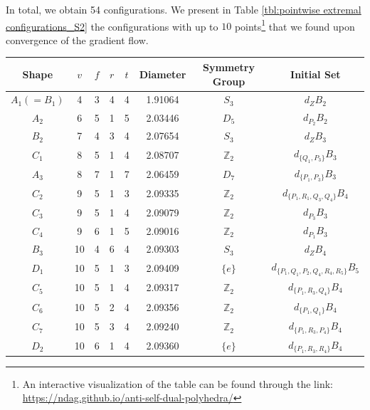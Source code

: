 \documentclass[12pt]{amsart}
\theoremstyle{plain}
\numberwithin{equation}{section}
\begin{document}
In total, we obtain 54 configurations.
We present in Table \ref{tbl:pointwise extremal configurations_S2} the configurations with up to $10$ points\footnote{An interactive visualization of the table can be found through the link: \url{https://ndag.github.io/anti-self-dual-polyhedra/}} that we found upon convergence of the gradient flow.
\begin{table}[!ht]
	\centering
	\begin{tabular}{|c|c|c|c|c|c|c|c|}
		\hline
		Shape & $v$  & $f$ & $r$ & $t$ & Diameter & Symmetry Group & Initial Set                      \\ \hline
		$A_1(=B_1)$ & 4  & 3 & 4 & 4 & 1.91064  & $S_3$          & $d_{Z}B_2$                         \\ \hline
		$A_2$ & 6  & 5 & 1 & 5 & 2.03446  & $D_5$          & $d_{P_2}B_2$                         \\ \hline
		$B_2$ & 7  & 4 & 3 & 4 & 2.07654  & $S_3$          & $d_{Z}B_3$                         \\ \hline
		$C_1$ & 8  & 5 & 1 & 4 & 2.08707  & $\mathbb{Z}_2$ & $d_{\{Q_1, P_3\}}B_3$                \\ \hline
		$A_3$ & 8  & 7 & 1 & 7 & 2.06459  & $D_7$          & $d_{\{P_1, P_3\}}B_3$                \\ \hline
		$C_2$ & 9  & 5 & 1 & 3 & 2.09335  & $\mathbb{Z}_2$ & $d_{\{P_1, R_1, Q_3, Q_4\}}B_4$         \\ \hline
		$C_3$ & 9  & 5 & 1 & 4 & 2.09079  & $\mathbb{Z}_2$ & $d_{P_3}B_3$                         \\ \hline
		$C_4$ & 9  & 6 & 1 & 5 & 2.09016  & $\mathbb{Z}_2$ & $d_{P_1}B_3$                         \\ \hline
		$B_3$ & 10 & 4 & 6 & 4 & 2.09303  & $S_3$          & $d_{Z}B_4$                         \\ \hline
		$D_1$ & 10 & 5 & 1 & 3 & 2.09409  & $\{e\}$        & $d_{\{P_1, Q_1, P_2, Q_4, R_4, R_5\}}B_5$ \\ \hline
		$C_5$ & 10 & 5 & 1 & 4 & 2.09317  & $\mathbb{Z}_2$ & $d_{\{P_1, R_3, Q_4\}}B_4$            \\ \hline
		$C_6$ & 10 & 5 & 2 & 4 & 2.09356  & $\mathbb{Z}_2$ & $d_{\{P_1, Q_1\}}B_4$                \\ \hline
		$C_7$ & 10 & 5 & 3 & 4 & 2.09240  & $\mathbb{Z}_2$ & $d_{\{P_1, R_3, P_4\}}B_4$            \\ \hline
		$D_2$ & 10 & 6 & 1 & 4 & 2.09360  & $\{e\}$        & $d_{\{P_1, R_3, R_4\}}B_4$            \\ \hline

\end{tabular}
\end{table}
\end{document}
